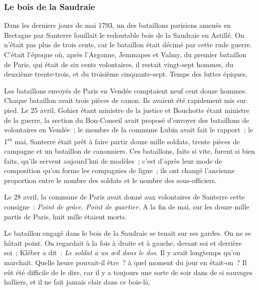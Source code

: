\documentclass[french,twoside]{book} %
\begin{document}
\subsubsection[{Le bois de la Saudraie}]{Le bois de la Saudraie}
\label{p1l1c1}
\noindent Dans les derniers jours de mai 1793, un des bataillons parisiens amenés en Bretagne par Santerre fouillait le redoutable bois de la Saudraie en Astillé. On n’était pas plus de trois cents, car le bataillon était décimé par cette rude guerre. C’était l’époque où, après l’Argonne, Jemmapes et Valmy, du premier bataillon de Paris, qui était de six cents volontaires, il restait vingt-sept hommes, du deuxième trente-trois, et du troisième cinquante-sept. Temps des luttes épiques.\par
Les bataillons envoyés de Paris en Vendée comptaient neuf cent douze hommes. Chaque bataillon avait trois pièces de canon. Ils avaient été rapidement  mis sur pied. Le 25 avril, Gohier étant ministre de la justice et Bouchotte étant ministre de la guerre, la section du Bon-Conseil avait proposé d’envoyer des bataillons de volontaires en Vendée ; le membre de la commune Lubin avait fait le rapport ; le 1\textsuperscript{er} mai, Santerre était prêt à faire partir douze mille soldats, trente pièces de campagne et un bataillon de canonniers. Ces bataillons, faits si vite, furent si bien faits, qu’ils servent aujourd’hui de modèles ; c’est d’après leur mode de composition qu’on forme les compagnies de ligne ; ils ont changé l’ancienne proportion entre le nombre des soldats et le nombre des sous-officiers.\par
Le 28 avril, la commune de Paris avait donné aux volontaires de Santerre cette consigne : \emph{Point de grâce. Point de quartier.} A la fin de mai, sur les douze mille partis de Paris, huit mille étaient morts.\par
Le bataillon engagé dans le bois de la Saudraie se tenait sur ses gardes. On ne se hâtait point. On regardait à la fois à droite et à gauche, devant soi et derrière soi ; Kléber a dit : \emph{Le soldat a un œil dans le dos}. Il y avait longtemps qu’on marchait. Quelle heure pouvait-il être ? à quel moment du jour en était-on ? Il eût été difficile de le dire, car il y a toujours une sorte de soir dans de si sauvages halliers, et il ne fait jamais clair dans ce bois-là.\par
\end{document}
